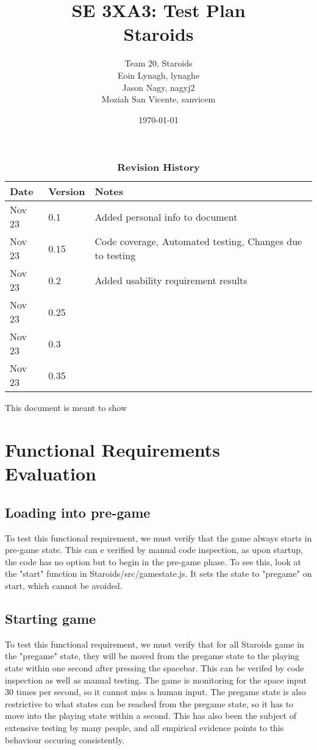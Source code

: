 \documentclass[12pt, titlepage]{article}
\title{SE 3XA3: Test Plan\\Staroids}
\author{Team 20, Staroids
		\\ Eoin Lynagh, lynaghe
		\\ Jason Nagy, nagyj2
		\\ Moziah San Vicente, sanvicem
}
\date{\today}
\begin{document}
\maketitle

\tableofcontents
\listoftables
\listoffigures

\begin{table}[bp]
\caption{\bf Revision History}
\begin{tabularx}{\textwidth}{p{3cm}p{2cm}X}
\toprule {\bf Date} & {\bf Version} & {\bf Notes}\\
\midrule
Nov 23 & 0.1 & Added personal info to document\\
Nov 23 & 0.15 & Code coverage, Automated testing, Changes due to testing\\
Nov 23 & 0.2 & Added usability requirement results\\
Nov 23 & 0.25 & \\
Nov 23 & 0.3 & \\
Nov 23 & 0.35 & \\
\bottomrule
\end{tabularx}
\end{table}

\newpage


This document is meant to show \\

\section{Functional Requirements Evaluation}
\subsection{Loading into pre-game}
To test this functional requirement, we must verify that the game always starts in pre-game state. This can e verified by manual code inspection, as upon startup, the code has no option but to begin in the pre-game phase. To see this, look at the "start" function in Staroids/src/gamestate.js. It sets the state to "pregame" on start, which cannot be avoided.
\subsection{Starting game}
To test this functional requirement, we must verify that for all Staroids game in the "pregame" state, they will be moved from the pregame state to the playing state within one second after pressing the spacebar. This can be verifed by code inspection as well as manual testing. The game is monitoring for the space input 30 times per second, so it cannot miss a human input. The pregame state is also restrictive to what states can be reached from the pregame state, so it has to move into the playing state within a second. This has also been the subject of extensive testing by many people, and all empirical evidence points to this behaviour occuring consistently.
\end{document}
